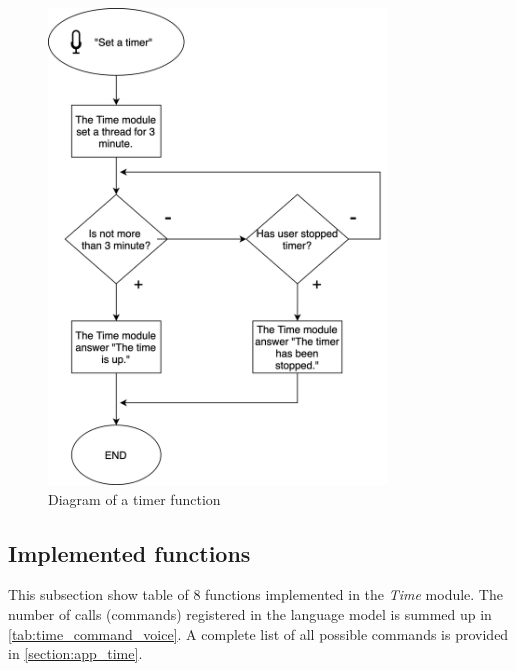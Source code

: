 \begin{figure}[H]
    \centering
    \includegraphics[width=0.8\textwidth]{img/timer_time_diagram.png}
    \caption{Diagram of a timer function}
    \label{fig:timer_time_diagram}
\end{figure}

\subsection{Implemented functions}

This subsection show table of 8 functions implemented in the \textit{Time} module. The number of calls (commands) registered in the language model is summed up in \cref{tab:time_command_voice}. A complete list of all possible commands is provided in \cref{section:app_time}.

